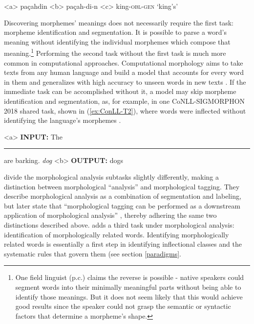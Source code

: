 \documentclass[12pt]{article}
\begin{document}
\begin{singlespace}


\label{ex:Lezgi1}
\a<a> pa\c{c}ahdin 
\label{ex:Lezgi1a}
\a<b> pa\c{c}ah-di-n 
\label{ex:Lezgi1b}
\a<c> king-\textsc{obl}-\textsc{gen} 
\label{ex:Lezgi1c}
\a `king's'
\label{ex:Lezgi1d}
\xe

\end{singlespace}

Discovering morphemes' meanings does not necessarily require the first task: morpheme identification and segmentation. It is possible to parse a word's meaning without identifying the individual morphemes which compose that meaning.\footnote{One field linguist (p.c.) claims the reverse is possible - native speakers could segment words into their minimally meaningful parts without being able to identify those meanings.  But it does not seem likely that this would achieve good results since the speaker could not grasp the semantic or syntactic factors that determine a morpheme’s shape.} Performing the second task without the first task is much more common in computational approaches. Computational morphology aims to take texts from any human language and build a model that accounts for every word in them and generalizes with high accuracy to unseen words in new texts \cite{goldsmith_computational_2017}. If the immediate task can be accomplished without it, a model may skip morpheme identification and segmentation, as, for example, in one CoNLL-SIGMORPHON 2018 shared task, shown in (\ref{ex:ConLL-T2}), where words were inflected without identifying the language's morphemes \cite{cotterell_conllsigmorphon_2018}.

\begin{singlespace}
\label{ex:ConLL-T2}
\a<a> \textbf{INPUT:}  The \rule{1cm}{0.15mm} are barking.  \hspace{5 mm} \textit{dog}
\label{ex:ConLL-T2a}
\a<b> \textbf{OUTPUT:} dogs
\label{ex:ConLL-T2b}
\xe
\end{singlespace}

 divide the morphological analysis subtasks slightly differently, making a distinction between morphological “analysis” and morphological tagging. They describe morphological analysis as a combination of segmentation and labeling, but later state that ``morphological tagging can be performed as a downstream application of morphological analysis'' , thereby adhering the same two distinctions described above.  adds a third task under morphological analysis: identification of morphologically related words. Identifying morphologically related words is essentially a first step in identifying inflectional classes and the systematic rules that govern them (see section \ref{paradigms}. 
\end{document}
